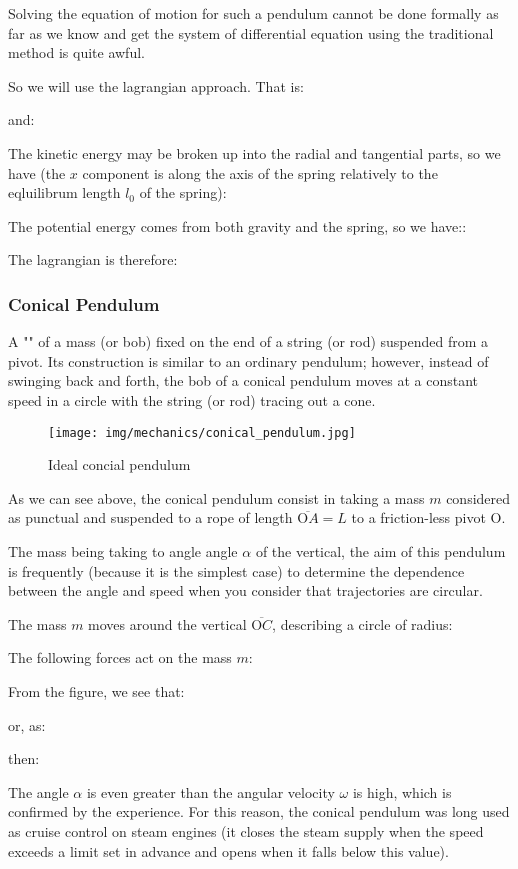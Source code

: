 	Solving the equation of motion for such a pendulum cannot be done formally as far as we know and get the system of differential equation using the traditional method is quite awful.

	So we will use the lagrangian approach. That is:
	
	and:
	
	The kinetic energy may be broken up into the radial and tangential parts, so we have (the $x$ component is along the axis of the spring relatively to the eqluilibrum length $l_0$ of the spring):
	
	The potential energy comes from both gravity and the spring, so we have::
	
	 The lagrangian is therefore:
	 
	
	\pagebreak
	\subsubsection{Conical Pendulum}
	A "" of a mass (or bob) fixed on the end of a string (or rod) suspended from a pivot. Its construction is similar to an ordinary pendulum; however, instead of swinging back and forth, the bob of a conical pendulum moves at a constant speed in a circle with the string (or rod) tracing out a cone. 
	\begin{figure}[H]
		\centering
		\texttt{[image: img/mechanics/conical\_pendulum.jpg]}
		\caption{Ideal concial pendulum}
	\end{figure}
	As we can see above, the conical pendulum consist in taking a mass $m$ considered as punctual and suspended to a rope of length $\overline{\text{O}A}=L$ to a friction-less pivot O.

	The mass being taking to angle angle $\alpha$ of the vertical, the aim of this pendulum is frequently (because it is the simplest case) to determine the dependence between the angle and speed when you consider that trajectories are circular.
	
	The mass $m$ moves around the vertical $\overline{\text{O}C}$, describing a circle of radius:
	
	The following forces act on the mass $m$:
	
	From the figure, we see that:
	
	or, as:
	
	then:
	
	The angle $\alpha$ is even greater than the angular velocity $\omega$ is high, which is confirmed by the experience. For this reason, the conical pendulum was long used as cruise control on steam engines (it closes the steam supply when the speed exceeds a limit set in advance and opens when it falls below this value).

